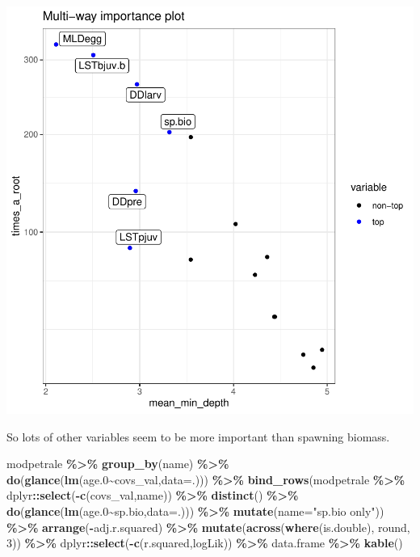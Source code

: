 \documentclass[
]{article}
\newenvironment{Shaded}{\begin{snugshade}}{\end{snugshade}}
\newcommand{\DataTypeTok}[1]{\textcolor[rgb]{0.13,0.29,0.53}{#1}}
\newcommand{\DecValTok}[1]{\textcolor[rgb]{0.00,0.00,0.81}{#1}}
\newcommand{\FloatTok}[1]{\textcolor[rgb]{0.00,0.00,0.81}{#1}}
\newcommand{\KeywordTok}[1]{\textcolor[rgb]{0.13,0.29,0.53}{\textbf{#1}}}
\newcommand{\NormalTok}[1]{#1}
\newcommand{\OperatorTok}[1]{\textcolor[rgb]{0.81,0.36,0.00}{\textbf{#1}}}
\newcommand{\StringTok}[1]{\textcolor[rgb]{0.31,0.60,0.02}{#1}}
\begin{document}
\includegraphics{calcurr_files/figure-latex/unnamed-chunk-4-2.pdf}

So lots of other variables seem to be more important than spawning
biomass.

\begin{Shaded}
\begin{Highlighting}[]
\NormalTok{modpetrale }\OperatorTok{\%>\%}\StringTok{ }
\StringTok{  }\KeywordTok{group\_by}\NormalTok{(name) }\OperatorTok{\%>\%}
\StringTok{  }\KeywordTok{do}\NormalTok{(}\KeywordTok{glance}\NormalTok{(}\KeywordTok{lm}\NormalTok{(age}\FloatTok{.0}\OperatorTok{\textasciitilde{}}\NormalTok{covs\_val,}\DataTypeTok{data=}\NormalTok{.))) }\OperatorTok{\%>\%}
\StringTok{  }\KeywordTok{bind\_rows}\NormalTok{(modpetrale }\OperatorTok{\%>\%}\StringTok{ }
\StringTok{              }\NormalTok{dplyr}\OperatorTok{::}\KeywordTok{select}\NormalTok{(}\OperatorTok{{-}}\KeywordTok{c}\NormalTok{(covs\_val,name)) }\OperatorTok{\%>\%}
\StringTok{              }\KeywordTok{distinct}\NormalTok{() }\OperatorTok{\%>\%}\StringTok{ }
\StringTok{              }\KeywordTok{do}\NormalTok{(}\KeywordTok{glance}\NormalTok{(}\KeywordTok{lm}\NormalTok{(age}\FloatTok{.0}\OperatorTok{\textasciitilde{}}\NormalTok{sp.bio,}\DataTypeTok{data=}\NormalTok{.))) }\OperatorTok{\%>\%}
\StringTok{              }\KeywordTok{mutate}\NormalTok{(}\DataTypeTok{name=}\StringTok{"sp.bio only"}\NormalTok{)) }\OperatorTok{\%>\%}
\StringTok{  }\KeywordTok{arrange}\NormalTok{(}\OperatorTok{{-}}\NormalTok{adj.r.squared) }\OperatorTok{\%>\%}\StringTok{ }
\StringTok{  }\KeywordTok{mutate}\NormalTok{(}\KeywordTok{across}\NormalTok{(}\KeywordTok{where}\NormalTok{(is.double), round, }\DecValTok{3}\NormalTok{)) }\OperatorTok{\%>\%}\StringTok{ }
\StringTok{  }\NormalTok{dplyr}\OperatorTok{::}\KeywordTok{select}\NormalTok{(}\OperatorTok{{-}}\KeywordTok{c}\NormalTok{(r.squared,logLik)) }\OperatorTok{\%>\%}\StringTok{ }
\StringTok{  }\NormalTok{data.frame }\OperatorTok{\%>\%}
\StringTok{  }\KeywordTok{kable}\NormalTok{()}
\end{Highlighting}
\end{Shaded}
\end{document}
